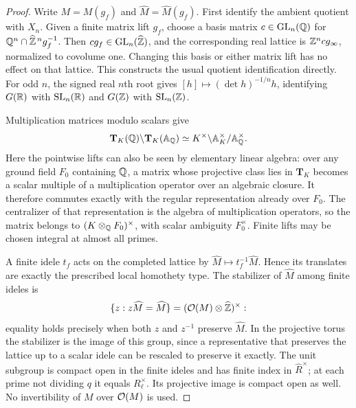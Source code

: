 \begin{proof}
Write $M=M(g_f)$ and $\widehat M=\widehat M(g_f)$.
First identify the ambient quotient with $X_n$. Given a finite matrix
lift $g_f$, choose a basis matrix $c\in\operatorname{GL}_n(\mathbb Q)$
for $\mathbb Q^n\cap\widehat{\mathbb Z}^{\,n}g_f^{-1}$. Then
$cg_f\in\operatorname{GL}_n(\widehat{\mathbb Z})$, and the corresponding
real lattice is $\mathbb Z^ncg_\infty$, normalized to covolume one.
Changing this basis or either matrix lift has no effect on that
lattice. This constructs the usual quotient identification directly.
For odd $n$, the signed real $n$th root gives
$[h]\mapsto(\det h)^{-1/n}h$, identifying
$G(\mathbb R)$ with $\operatorname{SL}_n(\mathbb R)$ and $G(\mathbb Z)$ with $\operatorname{SL}_n(\mathbb Z)$.

Multiplication matrices modulo scalars give
\begin{equation}\label{eq:idelic-torus-quotient}
 \mathbf T_K(\mathbb Q)\backslash\mathbf T_K(\mathbb A_\mathbb Q)
 \simeq K^\times\backslash\mathbb A_K^\times/\mathbb A_\mathbb Q^\times.
\end{equation}
Here the pointwise lifts can also be seen by elementary linear algebra:
over any ground field $F_0$ containing $\mathbb Q$, a matrix whose projective
class lies in $\mathbf T_K$ becomes a scalar multiple of a multiplication
operator over an algebraic closure. It therefore commutes exactly with
the regular representation already over $F_0$. The centralizer of that
representation is the algebra of multiplication operators, so the matrix
belongs to $(K\otimes_\mathbb Q F_0)^\times$, with scalar ambiguity $F_0^\times$.
Finite lifts may be chosen integral at almost all primes.

A finite idele $t_f$ acts on the completed lattice by
$\widehat M\mapsto t_f^{-1}\widehat M$. Hence its translates are
exactly the prescribed local homothety type. The stabilizer of
$\widehat M$ among finite ideles is
\[
 \{z:z\widehat M=\widehat M\}
       =(\mathcal O(M)\otimes\widehat{\mathbb Z})^\times:
\]
equality holds precisely when both $z$ and $z^{-1}$ preserve
$\widehat M$. In the projective torus the stabilizer is the image
of this group, since a representative that preserves the lattice
up to a scalar idele can be rescaled to preserve it exactly.
The unit subgroup is compact open in the finite ideles and has finite
index in $\widehat R^\times$; at each prime not dividing $q$ it equals
$R_\ell^\times$. Its projective image is compact open as well.
No invertibility of $M$ over $\mathcal O(M)$ is used.


\end{proof}
